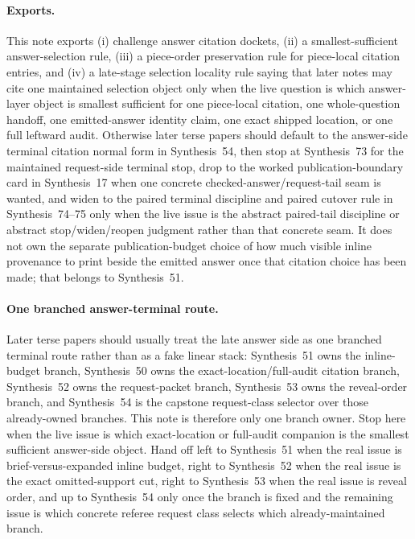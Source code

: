 \documentclass[11pt]{article}
\begin{document}
\paragraph{Exports.}
This note exports (i) challenge answer citation dockets, (ii) a smallest-sufficient answer-selection rule, (iii) a piece-order preservation rule for piece-local citation entries, and (iv) a late-stage selection locality rule saying that later notes may cite one maintained selection object only when the live question is which answer-layer object is smallest sufficient for one piece-local citation, one whole-question handoff, one emitted-answer identity claim, one exact shipped location, or one full leftward audit. Otherwise later terse papers should default to the answer-side terminal citation normal form in Synthesis~54, then stop at Synthesis~73 for the maintained request-side terminal stop, drop to the worked publication-boundary card in Synthesis~17 when one concrete checked-answer/request-tail seam is wanted, and widen to the paired terminal discipline and paired cutover rule in Synthesis~74--75 only when the live issue is the abstract paired-tail discipline or abstract stop/widen/reopen judgment rather than that concrete seam. It does not own the separate publication-budget choice of how much visible inline provenance to print beside the emitted answer once that citation choice has been made; that belongs to Synthesis~51.\cite{series:challengeanswerpublicationprofiles,series:challengeanswerreviewmenus,series:publicrequestresponsepacketrefreshresponsepacketclosureverdicts,series:pairedterminalcitationdiscipline,series:pairedterminalcutoverrules}

\paragraph{One branched answer-terminal route.}
Later terse papers should usually treat the late answer side as one branched terminal route rather than as a fake linear stack: Synthesis~51 owns the inline-budget branch, Synthesis~50 owns the exact-location/full-audit citation branch, Synthesis~52 owns the request-packet branch, Synthesis~53 owns the reveal-order branch, and Synthesis~54 is the capstone request-class selector over those already-owned branches. This note is therefore only one branch owner. Stop here when the live issue is which exact-location or full-audit companion is the smallest sufficient answer-side object. Hand off left to Synthesis~51 when the real issue is brief-versus-expanded inline budget, right to Synthesis~52 when the real issue is the exact omitted-support cut, right to Synthesis~53 when the real issue is reveal order, and up to Synthesis~54 only once the branch is fixed and the remaining issue is which concrete referee request class selects which already-maintained branch.
\end{document}
